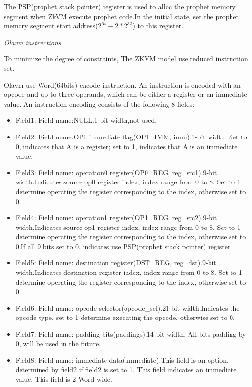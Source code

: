 The PSP(prophet stack pointer) register is used to alloc the prophet memory segment when ZkVM execute prophet code.In the initial state, set the prophet memory segment start address($2^{64} - 2*2^{32}$) to this register.

\emph{Olavm instructions}

To minimize the degree of constraints, The ZKVM model use reduced instruction set.

Olavm use Word(64bits) encode instruction.
An instruction is encoded with an opcode and up to three operands, which can be either a register or an immediate value.
An instruction encoding consists of the following 8 fields:
\begin{itemize}
    \item Field1: Field name:NULL.1 bit width,not used.
    \item Field2: Field name:OP1 immediate flag(OP1\_IMM, imm).1-bit width. Set to 0, indicates that A is a register; set to 1, indicates that A is an immediate value.
    \item Field3: Field name: operation0 register(OP0\_REG, reg\_src1).9-bit width.Indicates source op0 register index, index range from 0 to 8.
                  Set to 1 determine operating the register corresponding to the index, otherwise set to 0.
    \item Field4: Field name: operation1 register(OP1\_REG, reg\_src2).9-bit width.Indicates source op1 register index, index range from 0 to 8.
                  Set to 1 determine operating the register corresponding to the index, otherwise set to 0.If all 9 bits set to 0, indicates use PSP(prophet stack pointer) register.
    \item Field5: Field name: destination register(DST\_REG, reg\_dst).9-bit width.Indicates destination register index, index range from 0 to 8.
                  Set to 1 determine operating the register corresponding to the index, otherwise set to 0.
    \item Field6: Field name: opcode selector(opcode\_sel).21-bit width.Indicates the opcode type, set to 1 determine executing the opcode, otherwise set to 0.
    \item Field7: Field name: padding bits(paddings).14-bit width.
                  All bits padding by 0, will be used in the future.
    \item Field8: Field name: immediate data(immediate).This field is an option, determined by field2 if field2 is set to 1.
                  This field indicates an immediate value, This field is 2 Word wide.
\end{itemize}

